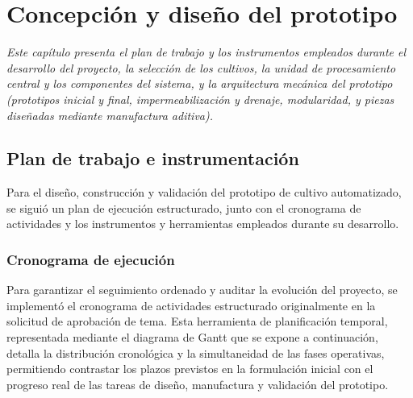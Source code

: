 \newcommand{\PENDIENTE}[1]{\textcolor{red}{\textbf{[PENDIENTE: #1]}}}

\chapter{Concepción y diseño del prototipo}
\label{cha:diseno_estructural}

\textit{Este capítulo presenta el plan de trabajo y los instrumentos empleados durante el desarrollo del proyecto, la selección de los cultivos, la unidad de procesamiento central y los componentes del sistema, y la arquitectura mecánica del prototipo (prototipos inicial y final, impermeabilización y drenaje, modularidad, y piezas diseñadas mediante manufactura aditiva).}

\section{Plan de trabajo e instrumentación}
\label{sec:plan_trabajo_instrumentacion}

Para el diseño, construcción y validación del prototipo de cultivo automatizado, se siguió un plan de ejecución estructurado, junto con el cronograma de actividades y los instrumentos y herramientas empleados durante su desarrollo.

\subsection{Cronograma de ejecución}
\label{sec:cronograma}

Para garantizar el seguimiento ordenado y auditar la evolución del proyecto, se implementó el cronograma de actividades estructurado originalmente en la solicitud de aprobación de tema. Esta herramienta de planificación temporal, representada mediante el diagrama de Gantt que se expone a continuación, detalla la distribución cronológica y la simultaneidad de las fases operativas, permitiendo contrastar los plazos previstos en la formulación inicial con el progreso real de las tareas de diseño, manufactura y validación del prototipo.

